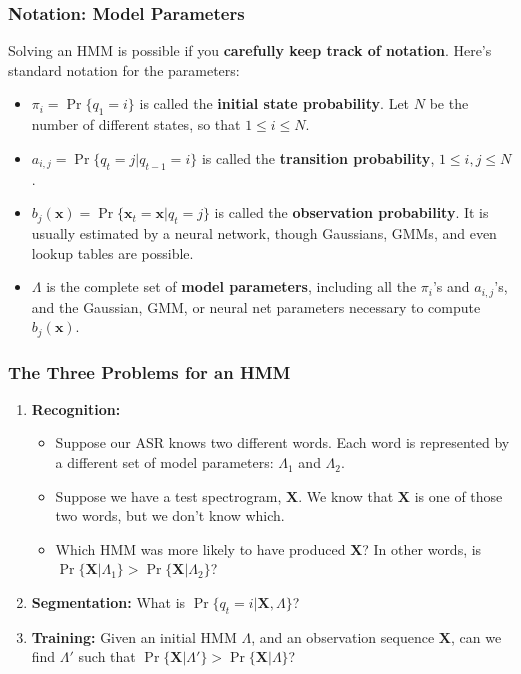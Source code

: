 \documentclass{beamer}
\begin{document}
\begin{frame}
  \frametitle{Notation: Model Parameters}

  Solving an HMM is possible if you {\bf carefully keep track of
  notation}.  Here's standard notation for the parameters:
  \begin{itemize}
  \item $\pi_i = \Pr\{q_1=i\}$ is called the {\bf initial state probability}.
    Let $N$ be the number of different states, so that $1\le i\le N$.
  \item $a_{i,j} = \Pr\{q_t=j|q_{t-1}=i\}$ is called the {\bf transition
    probability}, $1\le i,j\le N$.
  \item $b_j(\mathbf{x}) = \Pr\{\mathbf{x}_t=\mathbf{x}|q_t=j\}$ is called the
    {\bf observation probability}.  It is usually estimated by
    a neural network, though Gaussians, GMMs, and even lookup tables
    are possible.
  \item $\Lambda$ is the complete set of {\bf model parameters},
    including all the $\pi_i$'s and $a_{i,j}$'s, and the Gaussian, GMM,
    or neural net parameters necessary to compute $b_j(\mathbf{x})$.
  \end{itemize}
\end{frame}

\begin{frame}
  \frametitle{The Three Problems for an HMM}

  \begin{enumerate}
  \item {\bf Recognition:}
    \begin{itemize}
    \item Suppose our ASR knows two different words.  Each word is
      represented by a different set of model parameters: $\Lambda_1$
      and $\Lambda_2$.
    \item Suppose we have a test spectrogram, $\mathbf{X}$.  We know
      that $\mathbf{X}$ is one of those two words, but we don't know
      which.
    \item Which HMM was more likely to have produced $\mathbf{X}$?
      In other words, is
      $\Pr\{\mathbf{X}|\Lambda_1\}>\Pr\{\mathbf{X}|\Lambda_2\}$?
    \end{itemize}
  \item {\bf Segmentation:} What is $\Pr\{q_t=i|\mathbf{X},\Lambda\}$?
  \item {\bf Training:} Given an initial HMM $\Lambda$, and an
    observation sequence $\mathbf{X}$, can we find $\Lambda'$ such that
    $\Pr\{\mathbf{X}|\Lambda'\} > \Pr\{\mathbf{X}|\Lambda\}$?
  \end{enumerate}
\end{frame}
\end{document}
